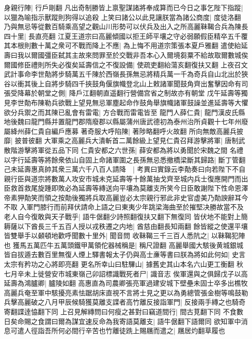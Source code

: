 身親行陣|{
	行戶剛翻}
凡出奇制勝皆上禀聖謀諸將奉成算而已今日之事乞陛下指蹤|{
	以獵為喻指示獸蹤則狗得以追殺}
上笑曰諸公以此見讓朕當為諸公商度|{
	度徒洛翻}
乃與無忌等從數百騎乘高望之觀山川形勢可以伏兵及出入之所高麗靺鞨合兵為陳長四十里|{
	長直亮翻}
江夏王道宗曰高麗傾國以拒王師平壤之守必弱願假臣精卒五千覆其本根則數十萬之衆可不戰而降上不應|{
	為上悔不用道宗策張本夏戶雅翻}
遣使紿延壽曰我以爾國彊臣弑其主故來問罪至於交戰非吾本心入爾境芻粟不給故取爾數城俟爾國修臣禮則所失必復矣延壽信之不復設備|{
	使疏吏翻紿蕩亥翻復扶又翻}
上夜召文武計事命李世勣將步騎萬五千陳於西嶺長孫無忌將精兵萬一千為奇兵自山北出於狹谷以衝其後上自將步騎四千挾鼓角偃旗幟登北山上敕諸軍聞鼓角齊出奮擊因命有司張受降幕於朝堂之側|{
	降戶江翻朝直遥翻行營備宫省之制故亦有朝堂}
戊午延壽等獨見李世勣布陳勒兵欲戰上望見無忌軍塵起命作鼓角舉旗幟諸軍鼓譟並進延壽等大懼欲分兵禦之而其陳已亂會有雷電|{
	方合戰而雷電皆至}
龍門人薛仁貴|{
	龍門漢皮氏縣地後魏曰龍門縣并置龍門郡隋廢郡以縣屬蒲州唐武德初為泰州治所貞觀十七年州廢屬絳州薛仁貴自編戶應募}
著奇服大呼陷陳|{
	著陟略翻呼火故翻}
所向無敵高麗兵披靡|{
	披普彼翻}
大軍乘之高麗兵大潰斬首二萬餘級上望見仁貴召拜游擊將軍|{
	唐制武散階游擊將軍從五品下同}
仁貴安都之六世孫|{
	薛安都為將以勇聞於宋魏之間}
名禮以字行延壽等將餘衆依山自固上命諸軍圍之長孫無忌悉撤橋梁斷其歸路|{
	斷丁管翻}
己未延壽惠真帥其衆三萬六千八百人請降　|{
	考異曰實錄云李勣奏曰向若陛下不自親行臣與道宗將數萬人攻安市城未克延壽等十餘萬抽戈齊至城内兵士復應開門而出臣救首救尾旋踵即敗必為延壽等縳送向平壤為莫離支所笑今日臣敢謝陛下性命恩澤帝素狎勣笑而領之按勣後獨將兵取高麗豈必太宗親行邪此非史官虚美乃勣諛辭耳今不取}
入軍門膝行而前拜伏請命上語之曰東夷少年跳梁海曲至於摧堅决勝故當不及老人自今復敢與天子戰乎|{
	語牛倨翻少詩照翻復扶又翻下無復同}
皆伏地不能對上簡耨薩以下酋長三千五百人授以戎秩遷之内地|{
	酋慈由翻長知兩翻}
餘皆縱之使還平壤皆雙舉手以顙頓地歡呼聞數十里外|{
	聞音問}
收靺鞨三千三百人悉阬之|{
	以靺鞨犯陣也}
獲馬五萬匹牛五萬頭鐵甲萬領佗器械稱是|{
	稱尺證翻}
高麗舉國大駭後黄城銀城皆自拔遁去數百里無復人煙上驛書報太子仍與高士亷等書曰朕為將如此何如|{
	史言太宗有矜功之心將即亮翻}
更名所幸山曰駐驆山|{
	據舊史其山本名六山更工衡翻}
秋七月辛未上徙營安市城東嶺己卯詔標識戰死者尸|{
	識音志}
俟軍還與之俱歸戊子以高延壽為鴻臚卿|{
	臚陵如翻}
高惠直為司農卿張亮軍過建安城下壁壘未固士卒多出樵牧高麗兵奄至軍中駭擾亮素怯踞胡床直視不言將士見之更以為勇總管張金樹等鳴鼓勒兵擊高麗破之八月甲辰候騎獲莫離支諜者高竹離反接詣軍門|{
	反接兩手縳之也騎奇寄翻諜逹恊翻下同}
上召見解縳問曰何瘦之甚對曰竊道間行|{
	間古莧翻下同}
不食數日矣命賜之食謂曰爾為謀宜速反命為我寄語莫離支|{
	語牛倨翻下語爾同}
欲知軍中消息可遣人徑詣吾所何必間行辛苦也竹離徒跣上賜屩而遣之|{
	屩居灼翻草履也}
